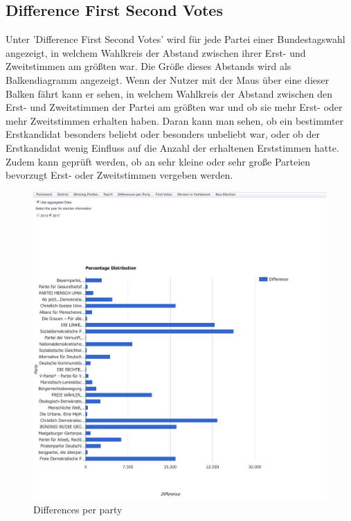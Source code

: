 \documentclass[a4paper]{scrreprt}
\begin{document}
\subsection{Difference First Second Votes}

Unter 'Difference First Second Votes' wird für jede Partei einer Bundestagswahl angezeigt, in welchem Wahlkreis der Abstand zwischen ihrer Erst- und Zweitstimmen am größten war. Die Größe dieses Abstands wird als Balkendiagramm angezeigt. Wenn der Nutzer mit der Maus über eine dieser Balken fährt kann er sehen, in welchem Wahlkreis der Abstand zwischen den Erst- und Zweitstimmen der Partei am größten war und ob sie mehr Erst- oder mehr Zweitstimmen erhalten haben. Daran kann man sehen, ob ein bestimmter Erstkandidat besonders beliebt oder besonders unbeliebt war, oder ob der Erstkandidat wenig Einfluss auf die Anzahl der erhaltenen Erststimmen hatte. Zudem kann geprüft werden, ob an sehr kleine oder sehr große Parteien bevorzugt Erst- oder Zweitstimmen vergeben werden. 

\begin{figure}[H]
\centering
\includegraphics[width=\textwidth]{images/diffrences_per_party.png}
\caption {Differences per party}
\end{figure}
\end{document}
